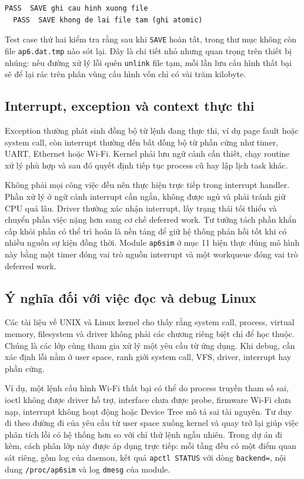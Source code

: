 \documentclass[11pt]{article}
\newcommand{\code}[1]{\texttt{#1}}
\begin{document}
\begin{lstlisting}[caption={Hai test case kiểm chứng cơ chế ghi nguyên tử}]
  PASS  SAVE ghi cau hinh xuong file
  PASS  SAVE khong de lai file tam (ghi atomic)
\end{lstlisting}

Test case thứ hai kiểm tra rằng sau khi \code{SAVE} hoàn tất, trong thư mục không còn file \code{ap6.dat.tmp} nào sót lại. Đây là chi tiết nhỏ nhưng quan trọng trên thiết bị nhúng: nếu đường xử lý lỗi quên \code{unlink} file tạm, mỗi lần lưu cấu hình thất bại sẽ để lại rác trên phân vùng cấu hình vốn chỉ có vài trăm kilobyte.

\subsection{Interrupt, exception và context thực thi}

Exception thường phát sinh đồng bộ từ lệnh đang thực thi, ví dụ page fault hoặc system call, còn interrupt thường đến bất đồng bộ từ phần cứng như timer, UART, Ethernet hoặc Wi-Fi. Kernel phải lưu ngữ cảnh cần thiết, chạy routine xử lý phù hợp và sau đó quyết định tiếp tục process cũ hay lập lịch task khác.

Không phải mọi công việc đều nên thực hiện trực tiếp trong interrupt handler. Phần xử lý ở ngữ cảnh interrupt cần ngắn, không được ngủ và phải tránh giữ CPU quá lâu. Driver thường xác nhận interrupt, lấy trạng thái tối thiểu và chuyển phần việc nặng hơn sang cơ chế deferred work. Tư tưởng tách phần khẩn cấp khỏi phần có thể trì hoãn là nền tảng để giữ hệ thống phản hồi tốt khi có nhiều nguồn sự kiện đồng thời. Module \code{ap6sim} ở mục 11 hiện thực đúng mô hình này bằng một timer đóng vai trò nguồn interrupt và một workqueue đóng vai trò deferred work.

\subsection{Ý nghĩa đối với việc đọc và debug Linux}

Các tài liệu về UNIX và Linux kernel cho thấy rằng system call, process, virtual memory, filesystem và driver không phải các chương riêng biệt chỉ để học thuộc. Chúng là các lớp cùng tham gia xử lý một yêu cầu từ ứng dụng. Khi debug, cần xác định lỗi nằm ở user space, ranh giới system call, VFS, driver, interrupt hay phần cứng.

Ví dụ, một lệnh cấu hình Wi-Fi thất bại có thể do process truyền tham số sai, ioctl không được driver hỗ trợ, interface chưa được probe, firmware Wi-Fi chưa nạp, interrupt không hoạt động hoặc Device Tree mô tả sai tài nguyên. Tư duy đi theo đường đi của yêu cầu từ user space xuống kernel và quay trở lại giúp việc phân tích lỗi có hệ thống hơn so với chỉ thử lệnh ngẫu nhiên. Trong dự án đi kèm, cách phân lớp này được áp dụng trực tiếp: mỗi tầng đều có một điểm quan sát riêng, gồm log của daemon, kết quả \code{apctl STATUS} với dòng \code{backend=}, nội dung \code{/proc/ap6sim} và log \code{dmesg} của module.
\end{document}
